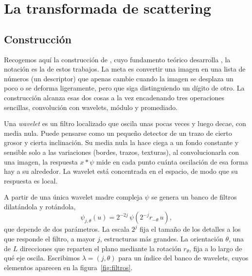 \documentclass[twocolumn,10pt,a4paper]{article}
\begin{document}
\section{La transformada de scattering}

\subsection{Construcción}

Recogemos aquí la construcción de \cite{bruna2013}, cuyo fundamento teórico
desarrolla \cite{mallat2012}, la notación es la de estos trabajos. La meta es
convertir una imagen en una lista de números (un descriptor) que apenas
cambie cuando la imagen se desplaza un poco o se deforma ligeramente, pero que
siga distinguiendo un dígito de otro. La construcción alcanza esas dos cosas a la
vez encadenando tres operaciones sencillas, convolución con wavelets, módulo y
promediado.

Una \emph{wavelet} es un filtro localizado que oscila unas pocas veces y luego
decae, con media nula. Puede pensarse como un pequeño detector de un trazo de
cierto grosor y cierta inclinación. Su media nula la hace ciega a un fondo
constante y sensible solo a las variaciones (bordes, trazos, texturas), al
convolucionarla con una imagen, la respuesta $x * \psi$ mide en cada punto cuánta
oscilación de esa forma hay a su alrededor. La wavelet está concentrada en el espacio, de
modo que su respuesta es local.

 A partir de una única wavelet madre compleja $\psi$ se genera un banco de filtros
dilatándola y rotándola,
\begin{equation}
  \psi_{j,\theta}(u) = 2^{-2j}\,\psi\!\left(2^{-j} r_{-\theta}\, u\right),
\end{equation}
que depende de dos parámetros. La escala $2^j$ fija el tamaño de los
detalles a los que responde el filtro, a mayor $j$, estructuras más grandes. La orientación $\theta$, una de $L$ direcciones que reparten el
plano mediante la rotación $r_\theta$, fija a lo largo de qué eje oscila.
Escribimos $\lambda = (j,\theta)$ para un índice del banco de wavelets, cuyos elementos
aparecen en la figura~\ref{fig:filtros}.
\end{document}
